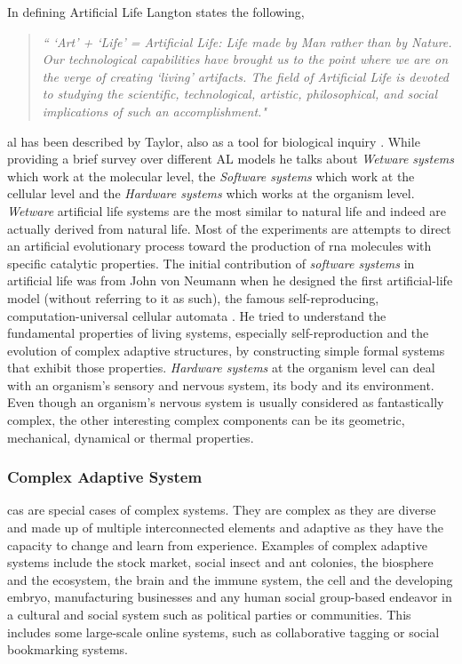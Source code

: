 \documentclass[letterpaper]{article}
\numberwithin{equation}{section}
\begin{document}
In defining Artificial Life Langton states the following,

\begin{quote}
\textsl{`` `Art' + `Life' = Artificial Life: Life made by Man rather than by Nature. Our technological capabilities have brought us to the point where we are on the verge of creating `living' artifacts. The field of Artificial Life is devoted to studying the scientific, technological, artistic, philosophical, and social implications of such an accomplishment."}
\end{quote}

\gls{al} has been described by Taylor, also as a tool for biological inquiry \cite{taylor1993}. While providing a brief survey over different AL models he talks about \textsl{Wetware systems} which work at the molecular level, the \textsl{Software systems} which work at the cellular level and the \textsl{Hardware systems} which works at the organism level. \textsl{Wetware} artificial life systems are the most similar to natural life and indeed are actually derived from natural life. Most of the experiments are attempts to direct an artificial evolutionary process toward the production of \gls{rna} molecules with specific catalytic properties. The initial contribution of \textsl{software systems} in artificial life was from John von Neumann when he designed the first artificial-life model (without referring to it as such), the famous self-reproducing, computation-universal cellular automata \cite{neumann1966}. He tried to understand the fundamental properties of living systems, especially self-reproduction and the evolution of complex adaptive structures, by constructing simple formal systems that exhibit those properties. \textsl{Hardware systems} at the organism level can deal with an organism's sensory and nervous system, its body and its environment. Even though an organism's nervous system is usually considered as fantastically complex, the other interesting complex components can be its geometric, mechanical, dynamical or thermal properties. 

\subsubsection{Complex Adaptive System}
\label{subsubsec:complex-adaptive-system}
\gls{cas} are special cases of complex systems. They are complex as they are diverse and made up of multiple interconnected elements and adaptive as they have the capacity to change and learn from experience. Examples of complex adaptive systems include the stock market, social insect and ant colonies, the biosphere and the ecosystem, the brain and the immune system, the cell and the developing embryo, manufacturing businesses and any human social group-based endeavor in a cultural and social system such as political parties or communities. This includes some large-scale online systems, such as collaborative tagging or social bookmarking systems.
\end{document}
